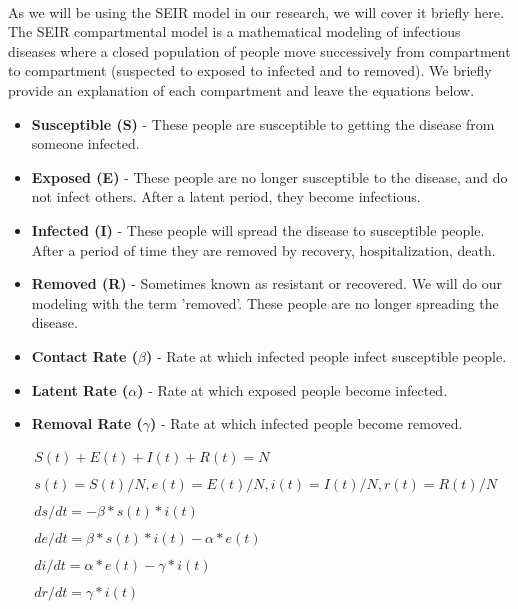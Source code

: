 \documentclass[12pt, a4, epsf] {article}
\theoremstyle{plain}
\theoremstyle{definition}
\begin{document}
\paragraph{}
As we will be using the SEIR model\cite{hethcote_2000} in our research, we will cover it briefly here. The SEIR compartmental model is a mathematical modeling of infectious diseases where a closed population of people move successively from compartment to compartment (suspected to exposed to infected and to removed). We briefly provide an explanation of each compartment and leave the equations below.
\begin{itemize}
	\item \textbf{Susceptible (S)} - These people are susceptible to getting the disease from someone infected.
	\item \textbf{Exposed (E)} - These people are no longer susceptible to the disease, and do not infect others. After a latent period, they become infectious.
	\item \textbf{Infected (I)} - These people will spread the disease to susceptible people. After a period of time they are removed by recovery, hospitalization, death.
	\item \textbf{Removed (R)} - Sometimes known as resistant or recovered. We will do our modeling with the term 'removed'. These people are no longer spreading the disease.
	\item \textbf{Contact Rate ($\beta$)} - Rate at which infected people infect susceptible people.
	\item \textbf{Latent Rate ($\alpha$)} - Rate at which exposed people become infected.
	\item \textbf{Removal Rate ($\gamma$)} - Rate at which infected people become removed.
\end{itemize}
\begin{align*}
&S(t) + E(t) + I(t) + R(t) = N \\\\
&s(t) = S(t)/N, e(t) = E(t)/N, i(t) = I(t)/N, r(t) = R(t)/N \\\\
&ds/dt = - \beta * s(t) * i(t) \\\\
&de/dt = \beta * s(t) * i(t) - \alpha * e(t) \\\\
&di/dt = \alpha * e(t) - \gamma * i(t) \\\\
&dr/dt = \gamma * i(t) \\\\
\end{align*}
\end{document}
